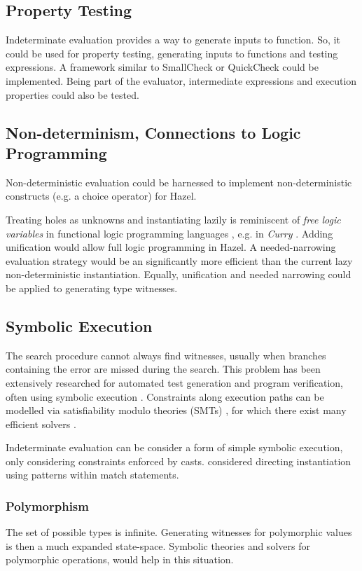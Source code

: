 \subsection{Property Testing}
Indeterminate evaluation provides a way to generate inputs to function. So, it could be used for property testing, generating inputs to functions and testing expressions. A framework similar to SmallCheck \cite{SmallCheck} or QuickCheck \cite{QuickCheck} could be implemented. Being part of the evaluator, intermediate expressions and execution properties could also be tested.

\subsection{Non-determinism, Connections to Logic Programming}
\label{sec:LogicProgramming}
Non-deterministic evaluation could be harnessed to implement non-deterministic constructs (e.g. a choice operator) for Hazel.

Treating holes as unknowns and instantiating lazily is reminiscent of \textit{free logic variables} in functional logic programming languages \cite{FunctionalLogicProgramming}, e.g. in \textit{Curry} \cite{CurryLang}. Adding unification \cite{UnificationSurvey} would allow full logic programming in Hazel. A needed-narrowing evaluation strategy \cite{NeededNarrowing} would be an significantly more efficient than the current lazy non-deterministic instantiation. Equally, unification and needed narrowing could be applied to generating type witnesses.

\subsection{Symbolic Execution}
The search procedure cannot always find witnesses, usually when branches containing the error are missed during the search. This problem has been extensively researched for automated test generation and program verification, often using symbolic execution \cite{SymbolicExecutionSurvey}. Constraints along execution paths can be modelled via satisfiability modulo theories (SMTs) \cite{SMTs}, for which there exist many efficient solvers \cite{SMTSolver}.

Indeterminate evaluation can be consider a form of simple {symbolic execution}, only considering constraints enforced by casts.  considered directing instantiation using patterns within match statements. 

\subsubsection{Polymorphism}
The set of possible types is infinite. Generating witnesses for polymorphic values is then a much expanded state-space. Symbolic theories and solvers for polymorphic operations, would help in this situation.

